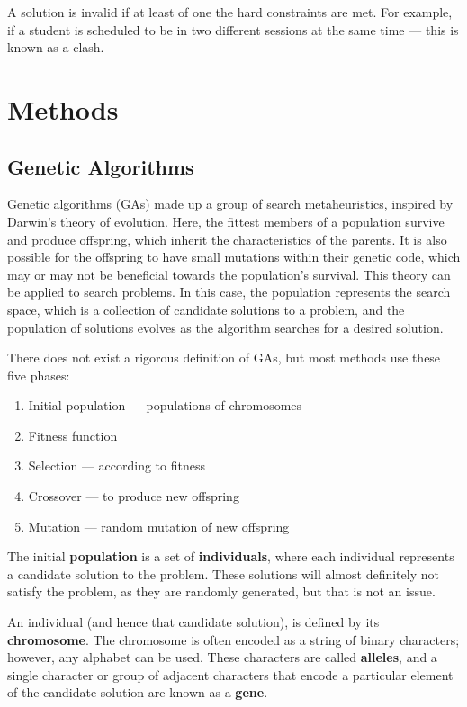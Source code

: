 \documentclass[a4paper, 12pt]{report}
\begin{document}
A solution is invalid if at least of one the hard constraints are met.
For example, if a student is scheduled to be in two different sessions at the
same time --- this is known as a clash.

\section{Methods}

\subsection{Genetic Algorithms}

Genetic algorithms (GAs) made up a group of search metaheuristics, inspired by
Darwin's theory of evolution.
Here, the fittest members of a population survive and produce offspring, which
inherit the characteristics of the parents.
It is also possible for the offspring to have small mutations within their
genetic code, which may or may not be beneficial towards the population's
survival.
This theory can be applied to search problems.
In this case, the population represents the search space, which is a collection 
of candidate solutions to a problem, and the population of solutions evolves as
the algorithm searches for a desired solution.

There does not exist a rigorous definition of GAs, but most methods use these
five phases:

\begin{enumerate}
	\item Initial population --- populations of chromosomes
	\item Fitness function
	\item Selection --- according to fitness
	\item Crossover --- to produce new offspring
	\item Mutation --- random mutation of new offspring
\end{enumerate}

The initial \textbf{population} is a set of \textbf{individuals}, where each
individual represents a candidate solution to the problem.
These solutions will almost definitely not satisfy the problem, as they are
randomly generated, but that is not an issue.

An individual (and hence that candidate solution), is defined by its
\textbf{chromosome}.
The chromosome is often encoded as a string of binary characters; however, any
alphabet can be used.
These characters are called \textbf{alleles}, and a single character or group of
adjacent characters that encode a particular element of the candidate solution
are known as a \textbf{gene}.
\end{document}
